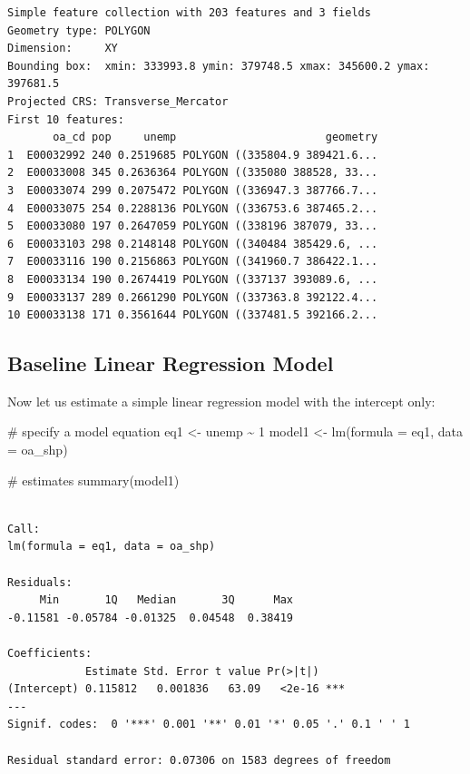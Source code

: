 \documentclass[
  letterpaper,
  DIV=11,
  numbers=noendperiod,
  oneside]{scrreprt}
\newenvironment{Shaded}{\begin{snugshade}}{\end{snugshade}}
\newcommand{\AttributeTok}[1]{\textcolor[rgb]{0.40,0.45,0.13}{#1}}
\newcommand{\CommentTok}[1]{\textcolor[rgb]{0.37,0.37,0.37}{#1}}
\newcommand{\DecValTok}[1]{\textcolor[rgb]{0.68,0.00,0.00}{#1}}
\newcommand{\FunctionTok}[1]{\textcolor[rgb]{0.28,0.35,0.67}{#1}}
\newcommand{\NormalTok}[1]{\textcolor[rgb]{0.00,0.23,0.31}{#1}}
\newcommand{\OtherTok}[1]{\textcolor[rgb]{0.00,0.23,0.31}{#1}}
\newcommand{\SpecialCharTok}[1]{\textcolor[rgb]{0.37,0.37,0.37}{#1}}
\begin{document}
\begin{verbatim}
Simple feature collection with 203 features and 3 fields
Geometry type: POLYGON
Dimension:     XY
Bounding box:  xmin: 333993.8 ymin: 379748.5 xmax: 345600.2 ymax: 397681.5
Projected CRS: Transverse_Mercator
First 10 features:
       oa_cd pop     unemp                       geometry
1  E00032992 240 0.2519685 POLYGON ((335804.9 389421.6...
2  E00033008 345 0.2636364 POLYGON ((335080 388528, 33...
3  E00033074 299 0.2075472 POLYGON ((336947.3 387766.7...
4  E00033075 254 0.2288136 POLYGON ((336753.6 387465.2...
5  E00033080 197 0.2647059 POLYGON ((338196 387079, 33...
6  E00033103 298 0.2148148 POLYGON ((340484 385429.6, ...
7  E00033116 190 0.2156863 POLYGON ((341960.7 386422.1...
8  E00033134 190 0.2674419 POLYGON ((337137 393089.6, ...
9  E00033137 289 0.2661290 POLYGON ((337363.8 392122.4...
10 E00033138 171 0.3561644 POLYGON ((337481.5 392166.2...
\end{verbatim}

\subsection{Baseline Linear Regression
Model}\label{baseline-linear-regression-model}

Now let us estimate a simple linear regression model with the intercept
only:

\begin{Shaded}
\begin{Highlighting}[]
\CommentTok{\# specify a model equation}
\NormalTok{eq1 }\OtherTok{\textless{}{-}}\NormalTok{ unemp }\SpecialCharTok{\textasciitilde{}} \DecValTok{1}
\NormalTok{model1 }\OtherTok{\textless{}{-}} \FunctionTok{lm}\NormalTok{(}\AttributeTok{formula =}\NormalTok{ eq1, }\AttributeTok{data =}\NormalTok{ oa\_shp)}

\CommentTok{\# estimates}
\FunctionTok{summary}\NormalTok{(model1)}
\end{Highlighting}
\end{Shaded}

\begin{verbatim}

Call:
lm(formula = eq1, data = oa_shp)

Residuals:
     Min       1Q   Median       3Q      Max 
-0.11581 -0.05784 -0.01325  0.04548  0.38419 

Coefficients:
            Estimate Std. Error t value Pr(>|t|)    
(Intercept) 0.115812   0.001836   63.09   <2e-16 ***
---
Signif. codes:  0 '***' 0.001 '**' 0.01 '*' 0.05 '.' 0.1 ' ' 1

Residual standard error: 0.07306 on 1583 degrees of freedom
\end{verbatim}
\end{document}
